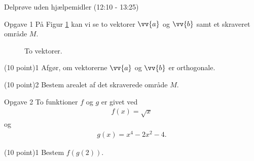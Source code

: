 \begin{center}
	\LARGE Delprøve uden hjælpemidler (12:10 - 13:25)
\end{center}
\begin{opgavetekst}{Opgave 1}
	På Figur \ref{fig:vektorer} kan vi se to vektorer $\vv{a}$ og $\vv{b}$ samt et skraveret område $M$.
	\begin{figure}[H]
		\centering
		\caption{To vektorer.}
		\label{fig:vektorer}
	\end{figure}
	\phantom{h}
\end{opgavetekst}
\begin{delopgave}{(10 point)}{1}
	Afgør, om vektorerne $\vv{a}$ og $\vv{b}$ er orthogonale.
\end{delopgave}
\begin{delopgave}{(10 point)}{2}
	Bestem arealet af det skraverede område $M$. 
\end{delopgave}


\begin{opgavetekst}{Opgave 2}
	To funktioner $f$ og $g$ er givet ved
	\begin{align*}
		f(x) = \sqrt{x}
	\end{align*}
	og 
	\begin{align*}
		g(x) = x^4-2x^2-4.
	\end{align*}
\end{opgavetekst}
\begin{delopgave}{(10 point)}{1}
	Bestem $f(g(2))$.
\end{delopgave}

